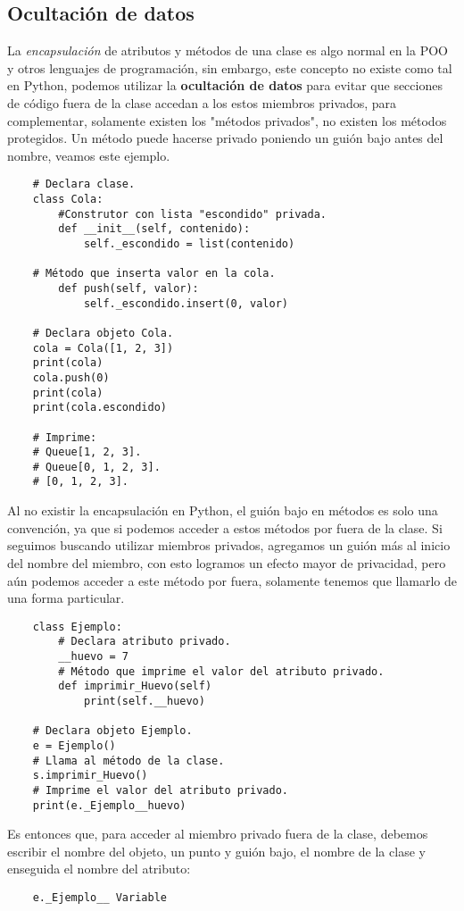\subsection{Ocultación de datos}

La \textit{encapsulación} de atributos y métodos de una clase es algo normal en la POO y otros lenguajes de programación, sin embargo, este concepto no existe como tal en Python, podemos utilizar la \textbf{ocultación de datos} para evitar que secciones de código fuera de la clase accedan a los estos miembros privados, para complementar, solamente existen los "métodos  privados", no existen los métodos protegidos. Un método puede hacerse privado poniendo un guión bajo antes del nombre, veamos este ejemplo.
\begin{lstlisting}
    # Declara clase.
    class Cola:
        #Construtor con lista "escondido" privada.
        def __init__(self, contenido):
            self._escondido = list(contenido)

    # Método que inserta valor en la cola.
        def push(self, valor):
            self._escondido.insert(0, valor)

    # Declara objeto Cola.
    cola = Cola([1, 2, 3])
    print(cola)
    cola.push(0)
    print(cola)
    print(cola.escondido)
      
    # Imprime:
    # Queue[1, 2, 3].
    # Queue[0, 1, 2, 3].
    # [0, 1, 2, 3].
\end{lstlisting}

Al no existir la encapsulación en Python, el guión bajo en métodos es solo una convención, ya que si podemos acceder a estos métodos por fuera de la clase. Si seguimos buscando utilizar miembros privados, agregamos un guión más al inicio del nombre del miembro, con esto logramos un efecto mayor de privacidad, pero aún podemos acceder a este método por fuera, solamente tenemos que llamarlo de una forma particular.
\begin{lstlisting}
    class Ejemplo:
        # Declara atributo privado.
        __huevo = 7
        # Método que imprime el valor del atributo privado.
        def imprimir_Huevo(self)
            print(self.__huevo)
         
    # Declara objeto Ejemplo.
    e = Ejemplo()
    # Llama al método de la clase.
    s.imprimir_Huevo()
    # Imprime el valor del atributo privado.
    print(e._Ejemplo__huevo)
\end{lstlisting}

Es entonces que, para acceder al miembro privado fuera de la clase, debemos escribir el nombre del objeto, un punto y guión bajo, el nombre de la clase y enseguida el nombre del atributo:
\begin{lstlisting}
    e._Ejemplo__ Variable
\end{lstlisting}


